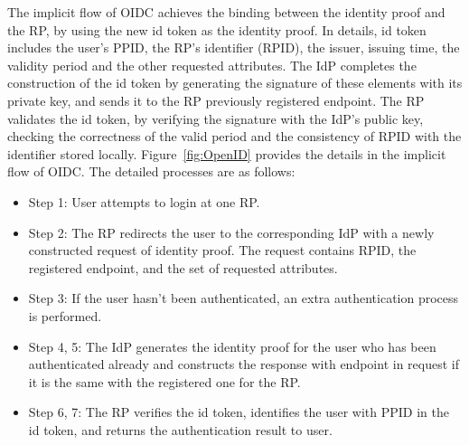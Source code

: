 The implicit flow of OIDC achieves the binding between the identity proof and the RP, by using the new id token as the identity proof. In details, id token includes the user's PPID, the RP's identifier (RPID), the issuer, issuing time, the validity period and the other requested attributes. The IdP completes the construction of the id token by generating the signature of these elements with its private key, and sends it to the RP previously registered endpoint. The RP validates the id token, by verifying the signature with the IdP's public key, checking the correctness of the valid period and the consistency of RPID with the identifier stored locally. Figure~\ref{fig:OpenID} provides the details in the implicit flow of OIDC. The detailed processes are as follows:
\begin{itemize}
    \item Step 1: User attempts to login at one RP.
    \item Step 2: The RP redirects the user to the corresponding IdP with a newly constructed request of identity proof. The request contains RPID, the registered endpoint, and the set of requested attributes. 
    \item Step 3: If the user hasn't been authenticated, an extra authentication process is performed.
    \item Step 4, 5: The IdP generates the identity proof for the user who has been authenticated already and constructs the response with endpoint in request if it is the same with the registered one for the RP. 
    \item Step 6, 7: The RP verifies the id token, identifies the user with PPID in the id token, and returns the authentication result to user.
\end{itemize}

